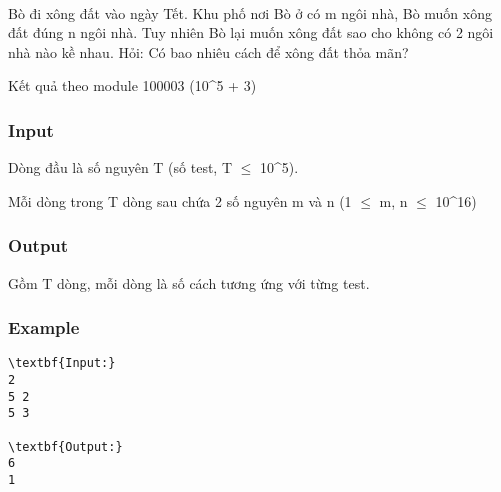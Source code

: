 

 

Bò đi xông đất vào ngày Tết. Khu phố nơi Bò ở có m ngôi nhà, Bò muốn xông đất đúng n ngôi nhà. Tuy nhiên Bò lại muốn xông đất sao cho không có 2 ngôi nhà nào kề nhau. Hỏi: Có bao nhiêu cách để xông đất thỏa mãn?

Kết quả theo module 100003 (10\textasciicircum5 + 3)

\subsubsection{Input}

Dòng đầu là số nguyên T (số test, T  $\le$  10\textasciicircum5).

Mỗi dòng trong T dòng sau chứa 2 số nguyên m và n (1  $\le$  m, n  $\le$  10\textasciicircum16)

\subsubsection{Output}

Gồm T dòng, mỗi dòng là số cách tương ứng với từng test.

\subsubsection{Example}
\begin{verbatim}
\textbf{Input:}
2
5 2
5 3

\textbf{Output:}
6
1\end{verbatim}

